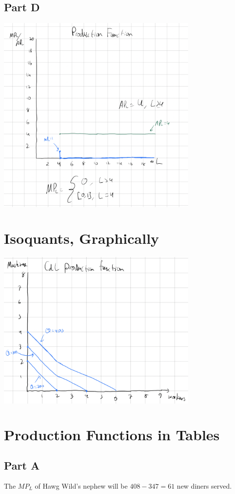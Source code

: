 \documentclass[8pt]{extarticle}
\begin{document}
{\subsection*{Part D}
\begin{center}
	\includegraphics[width=10cm]{HW6Q3D}
\end{center}
\section{Isoquants, Graphically}
\begin{center}
	\includegraphics[width=10cm]{HW6Q4}
\end{center}
\section{Production Functions in Tables}
\subsection*{Part A}
The $MP_L$ of Hawg Wild's nephew will be $408-347 = 61$ new diners served.
}
\end{document}
